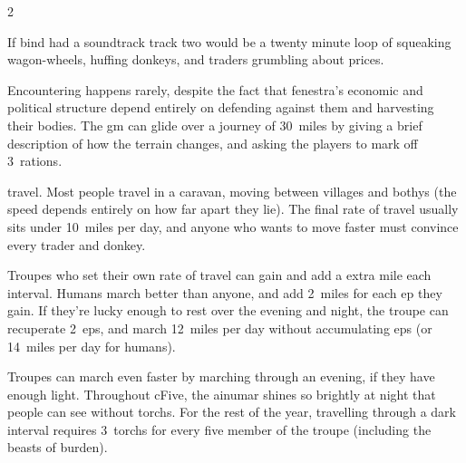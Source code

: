 \begin{multicols}{2}

\noindent
If \gls{bind} had a soundtrack track two would be a twenty minute loop of
squeaking wagon-wheels, huffing donkeys, and traders grumbling about prices.

Encountering  happens rarely, despite the fact that \gls{fenestra}'s economic and political structure depend entirely on defending against them and \gls{harvesting} their bodies.
The \gls{gm} can glide over a journey of 30~miles by giving a brief description of how the terrain changes, and asking the players to mark off 3~\glspl{ration}.

\label{travelChart}%

\Glsdesc{travel}.
Most people travel in a caravan, moving between \glspl{village} and \glspl{bothy} (the speed depends entirely on how far apart they lie).
The final rate of travel usually sits under 10~miles per day, and anyone who wants to move faster must convince every trader and donkey.

Troupes who set their own rate of travel can gain  and add a extra mile each \gls{interval}.
Humans march better than anyone, and add 2~miles for each \gls{ep} they gain.%
If they're lucky enough to rest over the evening and night, the troupe can recuperate 2~\glspl{ep}, and march 12~miles per day without accumulating \glspl{ep} (or 14~miles per day for humans).

Troupes can march even faster by marching through an evening, if they have enough light.
Throughout \gls{cFive}, the \gls{ainumar} shines so brightly at night that people can see without \glspl{torch}.
For the rest of the year, travelling through a dark \gls{interval} requires 3~\glspl{torch} for every five member of the troupe (including the beasts of burden).


\end{multicols}
